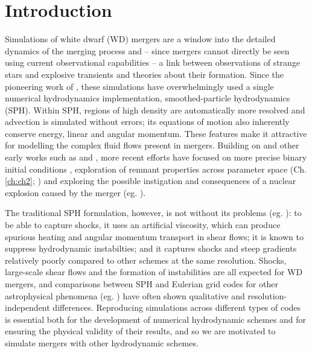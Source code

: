 \section{Introduction}
\label{sec:c3_intro}


Simulations of white dwarf (WD) mergers are a window into the detailed dynamics of the merging process and -- since mergers cannot directly be seen using current observational capabilities -- a link between observations of strange stars and explosive transients and theories about their formation.  Since the pioneering work of \cite{benz+90}, these simulations have overwhelmingly used a single numerical hydrodynamics implementation, smoothed-particle hydrodynamics (SPH).  Within SPH, regions of high density are automatically more resolved and advection is simulated without errors; its equations of motion also inherently conserve energy, linear and angular momentum.  These features make it attractive for modelling the complex fluid flows present in mergers.  Building on \citeauthor{benz+90} and other early works such as \cite{segrcm97} and \cite{guerig04}, more recent efforts have focused on more precise binary initial conditions \citep{dan+11}, exploration of remnant properties across parameter space (Ch. \ref{ch:ch2}; \citealt{loreig09, rask+12, dan+14}) and exploring the possible instigation and consequences of a nuclear explosion caused by the merger (eg. \citealt{pakm+10, dan+12, pakm+13, moll+14, rask+14}).

The traditional SPH formulation, however, is not without its problems (eg. \citealt{spri10,hopk15}): to be able to capture shocks, it uses an artificial viscosity, which can produce spurious heating and angular momentum transport in shear flows; it is known to suppress hydrodynamic instabilties; and it captures shocks and steep gradients relatively poorly compared to other schemes at the same resolution.  Shocks, large-scale shear flows and the formation of instabilities are all expected for WD mergers, and comparisons between SPH and Eulerian grid codes for other astrophysical phenomena (eg. \citealt{dval+06, tracsp07, mitc+09}) have often shown qualitative and resolution-independent differences.  Reproducing simulations across different types of codes is essential both for the development of numerical hydrodynamic schemes and for ensuring the physical validity of their results, and so we are motivated to simulate mergers with other hydrodynamic schemes.

